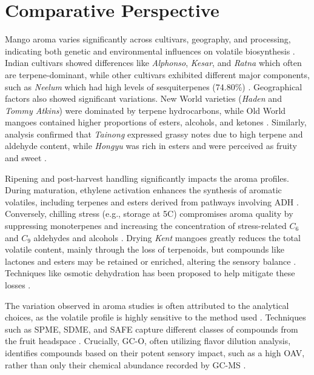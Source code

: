 \section{Comparative Perspective}
Mango aroma varies significantly across cultivars, geography, and processing, indicating both genetic and environmental influences on volatile biosynthesis \cite*{A13_ElHadi2013,A16_Tandel2023}. Indian cultivars showed differences like \textit{Alphonso}, \textit{Kesar}, and \textit{Ratna} which often are terpene-dominant, while other cultivars exhibited different major components, such as \textit{Neelum} which had high levels of sesquiterpenes (74.80\%) \cite*{A16_Tandel2023}. Geographical factors also showed significant variations. New World varieties (\textit{Haden} and \textit{Tommy Atkins}) were dominated by terpene hydrocarbons, while Old World mangoes contained higher proportions of esters, alcohols, and ketones \cite*{A13_ElHadi2013}. Similarly, analysis confirmed that \textit{Tainong} expressed grassy notes due to high terpene and aldehyde content, while \textit{Hongyu} was rich in esters and were perceived as fruity and sweet \cite*{A15_Xie2023}.

\vspace{1em}
Ripening and post-harvest handling significantly impacts the aroma profiles. During maturation, ethylene activation enhances the synthesis of aromatic volatiles, including terpenes and esters derived from pathways involving ADH \cite*{A10_Singh2010}. Conversely, chilling stress (e.g., storage at 5\textdegree C) compromises aroma quality by suppressing monoterpenes and increasing the concentration of stress-related $C_6$ and $C_9$ aldehydes and alcohols \cite*{A11_Sivankalyani2017}. Drying \textit{Kent} mangoes greatly reduces the total volatile content, mainly through the loss of terpenoids, but compounds like lactones and esters may be retained or enriched, altering the sensory balance \cite*{A07_Bonneau2016}. Techniques like osmotic dehydration has been proposed to help mitigate these losses \cite*{A02_Moreno2010}.

\vspace{1em}
The variation observed in aroma studies is often attributed to the analytical choices, as the volatile profile is highly sensitive to the method used \cite*{A13_ElHadi2013}. Techniques such as SPME, SDME, and SAFE capture different classes of compounds from the fruit headspace \cite*{A01_Aguirre-Lopez_2023,A07_Bonneau2016}. Crucially, GC-O, often utilizing flavor dilution analysis, identifies compounds based on their potent sensory impact, such as a high OAV, rather than only their chemical abundance recorded by GC-MS \cite*{A01_Aguirre-Lopez_2023,A07_Bonneau2016}.



